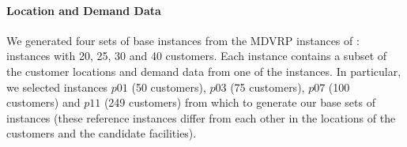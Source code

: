 \paragraph{Location and Demand Data}
We generated four sets of base instances from the MDVRP instances of \citet{Cordeau}:
instances with 20, 25, 30 and 40 customers. Each instance contains a subset of the
customer locations and demand data from one of the \citet{Cordeau} instances.
In particular, we selected instances $p01$ (50 customers), $p03$ (75 customers),
$p07$ (100 customers) and $p11$ (249 customers) from which to generate our base sets
of instances (these reference instances differ from each other in the locations
of the customers and the candidate facilities).

